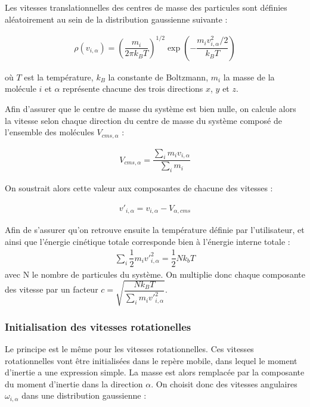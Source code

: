 \documentclass[12pt]{article}
\begin{document}
Les vitesses translationnelles des centres de masse des particules sont définies aléatoirement au sein de la distribution gaussienne suivante :

\begin{eqnarray} \label{eqn:gaussdisttrans}
\rho\left(v_{i,\alpha}\right)=\left(\dfrac{m_i}{2\pi k_B T}\right)^{1/2}\exp\left(-\dfrac{m_i v_{i,\alpha}^2/2}{k_B T}\right)
\end{eqnarray}

où $T$ est la température, $k_B$ la constante de Boltzmann, $m_i$ la masse de la molécule $i$ et $\alpha$ représente chacune des trois directions $x$, $y$ et $z$.

Afin d'assurer que le centre de masse du système est bien nulle, on calcule alors la vitesse selon chaque direction du centre de masse du système composé de l'ensemble des molécules $V_{cms,\alpha}$ :

\begin{eqnarray}
V_{cms,\alpha}=\dfrac{\sum_i m_i v_{i,\alpha}}{\sum_i m_i}
\end{eqnarray}

On soustrait alors cette valeur aux composantes de chacune des vitesses :

\begin{eqnarray}
v'_{i,\alpha}=v_{i,\alpha}-V_{\alpha,cms}
\end{eqnarray}

Afin de s'assurer qu'on retrouve ensuite la température définie par l'utilisateur, et ainsi que l'énergie cinétique totale corresponde bien à l'énergie interne totale :
\begin{eqnarray}
\sum_i \dfrac{1}{2} m_i {v'}_{i,\alpha}^2=\dfrac{1}{2}Nk_bT
\end{eqnarray}
avec N le nombre de particules du système. On multiplie donc chaque composante des vitesse par un facteur $c=\sqrt{\dfrac{Nk_BT}{\sum_i m_i {v'}_{i,\alpha}^2}}$.

		\subsubsection{Initialisation des vitesses rotationelles}

Le principe est le même pour les vitesses rotationnelles. Ces vitesses rotationnelles vont être initialisées dans le repère mobile, dans lequel le moment d'inertie a une expression simple. La masse est alors remplacée par la composante du moment d'inertie dans la direction $\alpha$. On choisit donc des vitesses angulaires $\omega_{i,\alpha}$ dans une distribution gaussienne :
\end{document}
